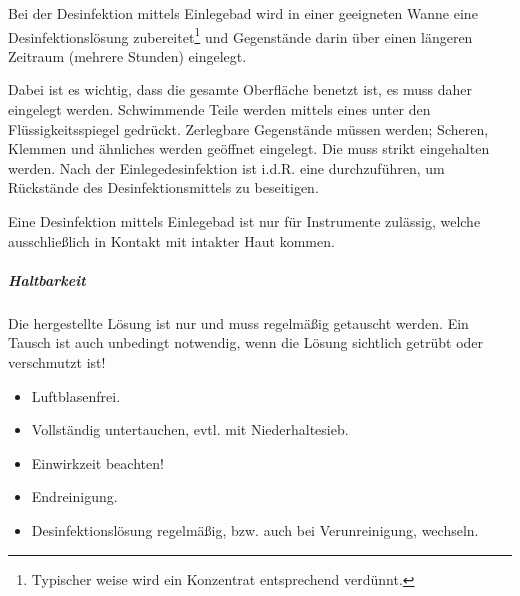 {
Bei der Desinfektion mittels Einlegebad wird in einer geeigneten Wanne eine
Desinfektionslösung zubereitet\footnote{Typischer weise wird ein Konzentrat
entsprechend verdünnt.} und Gegenstände darin über einen längeren Zeitraum
(mehrere Stunden) eingelegt. 


Dabei ist es wichtig, dass die gesamte Oberfläche benetzt ist, es muss daher
 eingelegt werden. Schwimmende Teile werden mittels eines
 unter den Flüssigkeitsspiegel gedrückt. Zerlegbare
Gegenstände müssen  werden; Scheren, Klemmen und
ähnliches werden geöffnet eingelegt. Die  muss strikt
eingehalten werden. Nach der Einlegedesinfektion ist i.d.R. eine
 durchzuführen, um Rückstände des Desinfektionsmittels zu beseitigen.

Eine Desinfektion mittels Einlegebad ist nur für Instrumente zulässig, welche
ausschließlich in Kontakt mit intakter Haut kommen. 

\subparagraph{Haltbarkeit}

Die hergestellte Lösung ist nur  und muss regelmäßig
getauscht werden. Ein Tausch ist auch unbedingt notwendig, wenn die Lösung sichtlich
getrübt oder verschmutzt ist!


}{
\begin{itemize}
  \item Luftblasenfrei. 
  \item Vollständig untertauchen, evtl. mit Niederhaltesieb. 
  \item Einwirkzeit beachten! 
  \item Endreinigung. 
  \item Desinfektionslösung regelmäßig, bzw. auch bei Verunreinigung, wechseln. 
\end{itemize}
}{}{}{}

